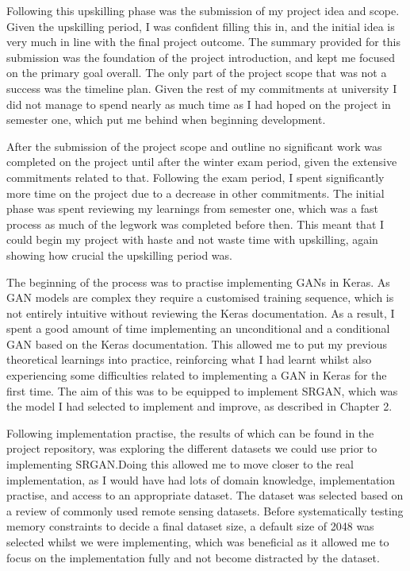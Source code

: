 \begin{appendices}
Following this upskilling phase was the submission of my project idea and scope. Given the upskilling period, I was confident filling this in, and the initial idea is very much in line with the final project outcome. The summary provided for this submission was the foundation of the project introduction, and kept me focused on the primary goal overall. The only part of the project scope that was not a success was the timeline plan. Given the rest of my commitments at university I did not manage to spend nearly as much time as I had hoped on the project in semester one, which put me behind when beginning development.

After the submission of the project scope and outline no significant work was completed on the project until after the winter exam period, given the extensive commitments related to that. Following the exam period, I spent significantly more time on the project due to a decrease in other commitments. The initial phase was spent reviewing my learnings from semester one, which was a fast process as much of the legwork was completed before then. This meant that I could begin my project with haste and not waste time with upskilling, again showing how crucial the upskilling period was.

The beginning of the process was to practise implementing GANs in Keras. As GAN models are complex they require a customised training sequence, which is not entirely intuitive without reviewing the Keras documentation. As a result, I spent a good amount of time implementing an unconditional and a conditional GAN based on the Keras documentation. This allowed me to put my previous theoretical learnings into practice, reinforcing what I had learnt whilst also experiencing some difficulties related to implementing a GAN in Keras for the first time. The aim of this was to be equipped to implement SRGAN, which was the model I had selected to implement and improve, as described in Chapter 2.

Following implementation practise, the results of which can be found in the project repository, was exploring the different datasets we could use prior to implementing SRGAN.\@ Doing this allowed me to move closer to the real implementation, as I would have had lots of domain knowledge, implementation practise, and access to an appropriate dataset. The dataset was selected based on a review of commonly used remote sensing datasets. Before systematically testing memory constraints to decide a final dataset size, a default size of 2048 was selected whilst we were implementing, which was beneficial as it allowed me to focus on the implementation fully and not become distracted by the dataset.


\end{appendices}
